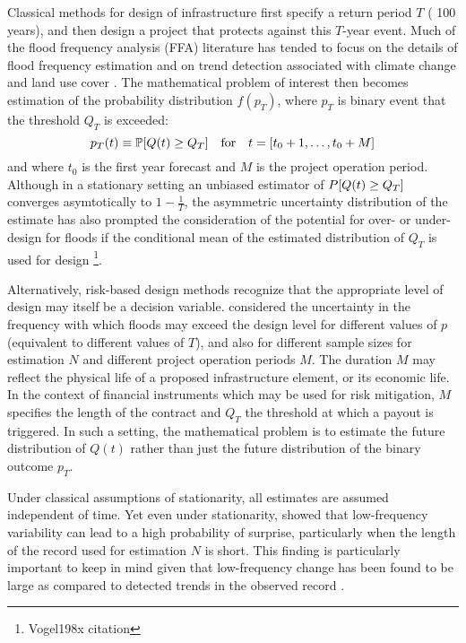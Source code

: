 \documentclass[11pt]{article}
\begin{document}
Classical methods for design of infrastructure first specify a return period \(T\) (\ie{} 100 years), and then design a project that protects against this \(T\)-year event.
Much of the flood frequency analysis (FFA) literature has tended to focus on the details of flood frequency estimation and on trend detection associated with climate change and land use cover \citep{Merz2008,Kidson2016,Merz2014}.
The mathematical problem of interest then becomes estimation of the probability distribution \(f(p_T)\), where \(p_T\) is binary event that the threshold \(Q_T\) is exceeded:
\begin{equation*}
  p_T(t) \equiv \probability \qty[ Q(t) \geq Q_T] \qqtext{for} t = \qty[t_0 + 1, \ldots, t_0 + M]
\end{equation*}
and where \(t_0\) is the first year forecast and \(M\) is the project operation period.
Although in a stationary setting an unbiased estimator of \( P \qty[ Q(t) \geq Q_T] \) converges asymtotically to \(1 - \frac{1}{T}\), the asymmetric uncertainty distribution of the estimate has also prompted the consideration of the potential for over- or under-design for floods if the conditional mean of the estimated distribution of \(Q_T\) is used for design \citep{Stedinger1997}\footnote{Vogel198x citation}.

Alternatively, risk-based design methods \citep[RBDM; see][]{Rosner2014} recognize that the appropriate level of design  may itself be a decision variable.
\citet{Lall1987} considered the uncertainty in the frequency with which floods may exceed the design level for different values of \(p\) (equivalent to different values of \(T\)), and also for different sample sizes for estimation \(N\) and different project operation periods \(M\).
The duration \(M\) may reflect the physical life of a proposed infrastructure element, or its economic life.
In the context of financial instruments which may be used for risk mitigation, \(M\) specifies the length of the contract and \(Q_T\) the threshold at which a payout is triggered.
In such a setting, the mathematical problem is to estimate the future distribution of \(Q(t)\) rather than just the future distribution of the binary outcome \(p_T\).

Under classical assumptions of stationarity, all estimates are assumed independent of time.
Yet even under stationarity, \citet{Jain2001} showed that low-frequency variability can lead to a high probability of surprise, particularly when the length of the record used for estimation \(N\) is short.
This finding is particularly important to keep in mind given that low-frequency change has been found to be large as compared to detected trends in the observed record \citep{Hodgkins2017}.
\end{document}
